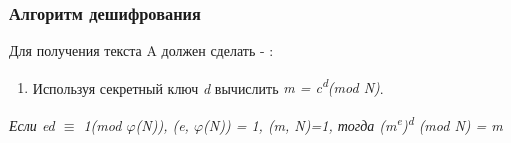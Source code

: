   \subsubsection{Алгоритм дешифрования}
  Для получения текста A должен сделать - \cite[Глава 9, страницы 148-155]{tilb06}:
    
    \begin{enumerate}
     \item Используя секретный ключ \textit{d} вычислить \textit{m = c\textsuperscript{d}(mod N)}.
    \end{enumerate}  
    
  \begin{theorem}
    \textit{Если ed {$\equiv$} 1(mod {$\varphi$}(N)), (e, {$\varphi$}(N)) = 1, (m, N)=1, тогда (m\textsuperscript{e})\textsuperscript{d} (mod N) = m}
  \end{theorem}
